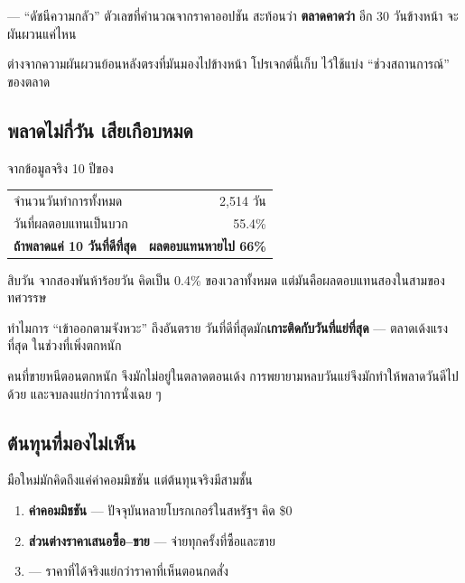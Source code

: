 \documentclass[11pt]{article}
\begin{document}
\begin{term}{ --- ``ดัชนีความกลัว''}
ตัวเลขที่คำนวณจากราคาออปชัน สะท้อนว่า \textbf{ตลาดคาดว่า} อีก 30 วันข้างหน้า
จะผันผวนแค่ไหน

ต่างจากความผันผวนย้อนหลังตรงที่มันมองไปข้างหน้า
โปรเจกต์นี้เก็บ  ไว้ใช้แบ่ง ``ช่วงสถานการณ์'' ของตลาด
\end{term}

\subsection{พลาดไม่กี่วัน เสียเกือบหมด}

จากข้อมูลจริง 10 ปีของ 

\begin{center}
\small
\begin{tabular}{lr}
\toprule
จำนวนวันทำการทั้งหมด & 2,514 วัน \\
วันที่ผลตอบแทนเป็นบวก & 55.4\% \\
\midrule
\textbf{ถ้าพลาดแค่ 10 วันที่ดีที่สุด} & \textbf{ผลตอบแทนหายไป 66\%} \\
\bottomrule
\end{tabular}
\end{center}

สิบวัน จากสองพันห้าร้อยวัน คิดเป็น 0.4\% ของเวลาทั้งหมด
แต่มันคือผลตอบแทนสองในสามของทศวรรษ

\begin{trap}{ทำไมการ ``เข้าออกตามจังหวะ'' ถึงอันตราย}
วันที่ดีที่สุดมัก\textbf{เกาะติดกับวันที่แย่ที่สุด} --- ตลาดเด้งแรงที่สุด
ในช่วงที่เพิ่งตกหนัก

คนที่ขายหนีตอนตกหนัก จึงมักไม่อยู่ในตลาดตอนเด้ง
การพยายามหลบวันแย่จึงมักทำให้พลาดวันดีไปด้วย และจบลงแย่กว่าการนั่งเฉย ๆ
\end{trap}

\subsection{ต้นทุนที่มองไม่เห็น}

มือใหม่มักคิดถึงแค่ค่าคอมมิชชัน แต่ต้นทุนจริงมีสามชั้น

\begin{enumerate}
\item \textbf{ค่าคอมมิชชัน} --- ปัจจุบันหลายโบรกเกอร์ในสหรัฐฯ คิด \$0
\item \textbf{ส่วนต่างราคาเสนอซื้อ--ขาย} --- จ่ายทุกครั้งที่ซื้อและขาย
\item \textbf{} --- ราคาที่ได้จริงแย่กว่าราคาที่เห็นตอนกดสั่ง
\end{enumerate}
\end{document}
